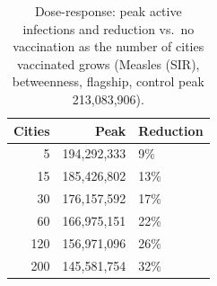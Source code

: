 \begin{table}[t]
\centering
\caption{Dose-response: peak active infections and reduction vs.\ no vaccination as the number of cities vaccinated grows (Measles (SIR), betweenness, flagship, control peak 213,083,906).}
\label{tab:dose}
\begin{tabular}{rrl}
\toprule
Cities & Peak & Reduction \\
\midrule
5 & 194,292,333 & 9\% \\
15 & 185,426,802 & 13\% \\
30 & 176,157,592 & 17\% \\
60 & 166,975,151 & 22\% \\
120 & 156,971,096 & 26\% \\
200 & 145,581,754 & 32\% \\
\bottomrule
\end{tabular}
\end{table}
